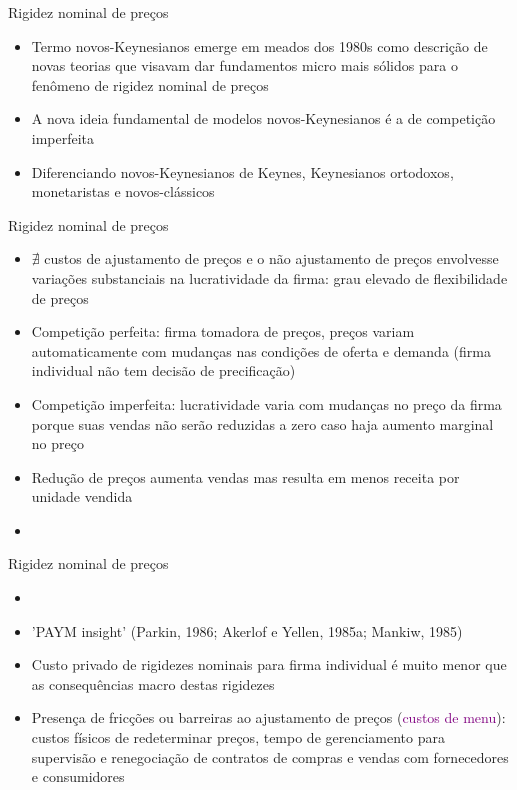 \documentclass[10pt]{beamer}
\begin{document}
\begin{frame}{Rigidez nominal de preços}
    \begin{itemize}
        \item Termo novos-Keynesianos emerge em meados dos 1980s como descrição de novas teorias que visavam dar fundamentos micro mais sólidos para o fenômeno de rigidez nominal de preços\bigskip
        \item A nova ideia fundamental de modelos novos-Keynesianos é a de competição imperfeita\bigskip
        \item Diferenciando novos-Keynesianos de Keynes, Keynesianos ortodoxos, monetaristas e novos-clássicos
    \end{itemize}
\end{frame}

\begin{frame}{Rigidez nominal de preços}
    \begin{itemize}
        \item $\nexists$ custos de ajustamento de preços e o não ajustamento de preços envolvesse variações substanciais na lucratividade da firma: grau elevado de flexibilidade de preços\bigskip
        \item Competição perfeita: firma tomadora de preços, preços variam automaticamente com mudanças nas condições de oferta e demanda (firma individual não tem decisão de precificação)\bigskip
        \item Competição imperfeita: lucratividade varia com mudanças no preço da firma porque suas vendas não serão reduzidas a zero caso haja aumento marginal no preço\bigskip
        \item Redução de preços aumenta vendas mas resulta em menos receita por unidade vendida\bigskip
        \item {}
    \end{itemize}
\end{frame}

\begin{frame}{Rigidez nominal de preços}
    \begin{itemize}
        \item {}\bigskip
        \item 'PAYM insight' (Parkin, 1986; Akerlof e Yellen, 1985a; Mankiw, 1985)\bigskip
        \item Custo privado de rigidezes nominais para firma individual é muito menor que as consequências macro destas rigidezes\bigskip
        \item Presença de fricções ou barreiras ao ajustamento de preços (\textcolor{purple}{custos de menu}): custos físicos de redeterminar preços, tempo de gerenciamento para supervisão e renegociação de contratos de compras e vendas com fornecedores e consumidores
    \end{itemize}
\end{frame}
\end{document}
